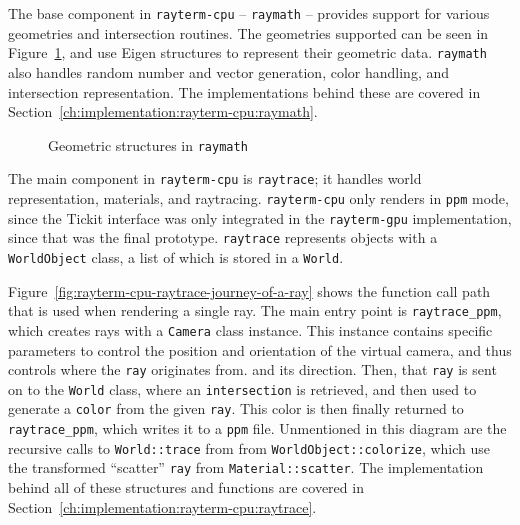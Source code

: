 The base component in \texttt{rayterm-cpu} -- \texttt{raymath} -- provides support for various geometries and intersection routines. The geometries supported can be seen in Figure~\ref{fig:rayterm-cpu-raymath-geometry}, and use Eigen structures to represent their geometric data.
\texttt{raymath} also handles random number and vector generation, color handling, and intersection representation.
The implementations behind these are covered in Section~\ref{ch:implementation:rayterm-cpu:raymath}.

\begin{figure}[htb]
  \centering
  \caption{Geometric structures in \texttt{raymath}}
  \label{fig:rayterm-cpu-raymath-geometry}
\end{figure}

The main component in \texttt{rayterm-cpu} is \texttt{raytrace}; it handles world representation, materials, and raytracing.
\texttt{rayterm-cpu} only renders in \texttt{ppm} mode, since the Tickit interface was only integrated in the \texttt{rayterm-gpu} implementation, since that was the final prototype.
\texttt{raytrace} represents objects with a \texttt{WorldObject} class, a list of which is stored in a \texttt{World}.

Figure~\ref{fig:rayterm-cpu-raytrace-journey-of-a-ray} shows the function call path that is used when rendering a single ray.
The main entry point is \texttt{raytrace\_ppm}, which creates rays with a \texttt{Camera} class instance.
This instance contains specific parameters to control the position and orientation of the virtual camera, and thus controls where the \texttt{ray} originates from. and its direction.
Then, that \texttt{ray} is sent on to the \texttt{World} class, where an \texttt{intersection} is retrieved, and then used to generate a \texttt{color} from the given \texttt{ray}.
This color is then finally returned to \texttt{raytrace\_ppm}, which writes it to a \texttt{ppm} file.
Unmentioned in this diagram are the recursive calls to \texttt{World::trace} from from \texttt{WorldObject::colorize}, which use the transformed ``scatter'' \texttt{ray} from \texttt{Material::scatter}.
The implementation behind all of these structures and functions are covered in Section~\ref{ch:implementation:rayterm-cpu:raytrace}.

